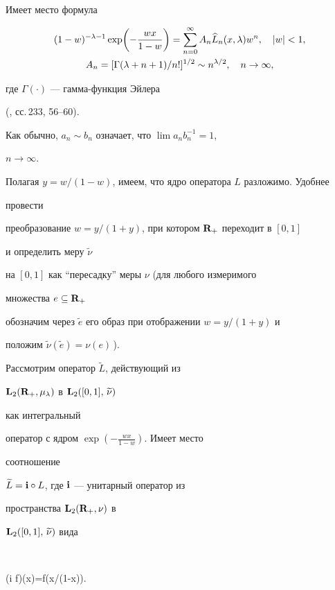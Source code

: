 Имеет место формула


\begin{gather}


(1-w)^{-\lambda-1}\exp\biggl(-\frac{wx}{1-w}\biggr)=


\sum^\infty_{n=0}A_n\widehat L_n(x,\lambda)w^n,


\quad |w|<1,\\


A_n=[\Gamma(\lambda+n+1)/n!]^{1/2}\sim n^{\lambda/2},\quad


n\to\infty,\notag


\end{gather}


где $\Gamma(\cdot)$ --- гамма-функция Эйлера


(\cite{5}, сс.\,233, 56--60).


Как обычно, $a_n\sim b_n$ означает, что $\lim a_nb^{-1}_n=1$,


$n\to\infty$.





Полагая $y=w/(1-w)$, имеем, что ядро оператора $L$ разложимо. Удобнее


провести


преобразование $w=y/(1+y)$, при котором $\bold R_+$ переходит в $[0,1]$


и определить меру $\widetilde\nu$


на $[0,1]$ как ``пересадку'' меры $\nu$ (для любого измеримого


множества $e\subseteq\bold R_+$


обозначим через $\widetilde e$ его образ при отображении $w=y/(1+y)$ и


положим $\widetilde\nu(\widetilde e)=\nu(e)$\,).


Рассмотрим оператор $\widetilde L$, действующий из


$\bold L_2(\bold R_+,\mu_\lambda)$ в $\bold L_2([0,1],\,\widetilde \nu)$


как интегральный


оператор с ядром $\exp\left(-\frac{wx}{1-w}\right)$. Имеет место


соотношение


$\widetilde L=\bold i\circ L$, где $\bold i$ --- унитарный оператор из


пространства $\bold L_2(\bold R_+,\nu)$ в


$\bold L_2([0,1],\,\widetilde\nu)$ вида


$$


(\bold i f)(x)=f(x/(1-x)).


